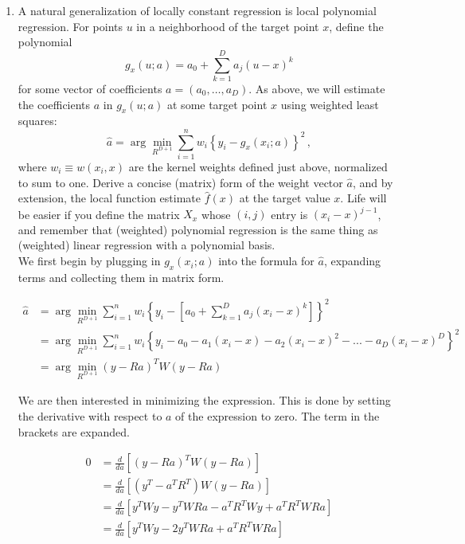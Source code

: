 \documentclass[10pt]{article}
\begin{document}
    \begin{enumerate}[label=(\Alph*)]
        \item  A natural generalization of locally constant regression is local polynomial regression.  For points $u$ in a neighborhood of the target point $x$, define the polynomial
        $$
        g_{x}(u; a) = a_0 + \sum_{k=1}^D a_j(u-x)^k 
        $$
        for some vector of coefficients $a = (a_0, \ldots, a_D)$.  As above, we will estimate the coefficients $a$ in $g_{x}(u; a)$ at some target point $x$ using weighted least squares:
        $$
        \hat{a} = \arg \min_{R^{D+1}} \sum_{i=1}^n w_i \left\{ y_i - g_{x}(x_i; a)  \right\}^2 \, ,
        $$
        where $w_i \equiv w(x_i, x)$ are the kernel weights defined just above, normalized to sum to one. Derive a concise (matrix) form of the weight vector $\hat{a}$, and by extension, the local function estimate $\hat{f}(x)$ at the target value $x$. Life will be easier if you define the matrix $X_x$ whose $(i,j)$ entry is $(x_i-x)^{j-1}$, and remember that (weighted) polynomial regression is the same thing as (weighted) linear regression with a polynomial basis.\\

        We first begin by plugging in $g_x(x_i; a)$ into the formula for $\hat{a}$, expanding terms and collecting them in matrix form.

        \begin{align*}
            \hat{a} &= \arg \min_{R^{D+1}} \sum_{i=1}^n w_i \left \{ y_i - \left [a_0 + \sum_{k=1}^D a_j (x_i - x)^k \right] \right \}^2 \\
            &= \arg \min_{R^{D+1}}\sum_{i=1}^n w_i \left \{y_i - a_0 - a_1(x_i - x) - a_2 (x_i - x)^2 - ... - a_D (x_i - x)^D \right\}^2 \\
            &= \arg \min_{R^{D+1}} (y - R a)^T W (y - R a)
        \end{align*}

        We are then interested in minimizing the expression. This is done by setting the derivative with respect to $a$ of the expression to zero. The term in the brackets are expanded.

        \begin{align*}
            0 &= \frac{d}{da} \left [ (y - R a)^T W (y - R a) \right] \\
            &= \frac{d}{da} \left[ (y^T - a^T R^T) W (y - R a) \right] \\
            &= \frac{d}{da} \left[ y^T W y - y^T W R a - a^T R^T W y + a^T R^T W R a \right] \\
            &= \frac{d}{da} \left[ y^T W y - 2 y^T W R a + a^T R^T W R a\right] \\
        \end{align*}


\end{enumerate}
\end{document}
